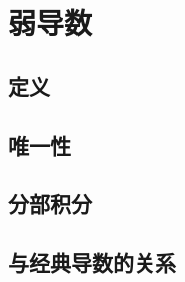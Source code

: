 \section{弱导数}
\label{b1:sec:2004}


\subsection{定义}
\label{b1:subsec:200401}

\subsection{唯一性}
\label{b1:subsec:200402}

\subsection{分部积分}
\label{b1:subsec:200403}

\subsection{与经典导数的关系}
\label{b1:subsec:200404}


